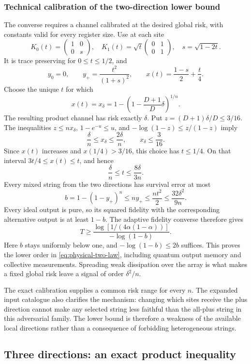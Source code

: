 \documentclass[11pt,a4paper]{article}
\numberwithin{equation}{section}
\begin{document}
\subsubsection*{Technical calibration of the two-direction lower bound}

The converse requires a channel calibrated at the desired global risk, with constants valid for every register size. Use at each site
\[
 K_0(t)=\begin{pmatrix}1&0\\0&s\end{pmatrix},
 \quad K_1(t)=\sqrt t\begin{pmatrix}0&1\\0&1\end{pmatrix},
 \quad s=\sqrt{1-2t}.
\]
It is trace preserving for $0\le t\le1/2$, and
\[
 y_0=0,\qquad y_+=\frac{t^2}{(1+s)^2},
 \qquad x(t)=\frac{1-s}{2}+\frac t4.
\]
Choose the unique $t$ for which
\[
 x(t)=x_\delta
 =1-\left(1-\frac{D+1}{D}\delta\right)^{1/n}.
\]
The resulting product channel has risk exactly $\delta$. Put $z=(D+1)\delta/D\le3/16$. The inequalities
$z\le nx_\delta$, $1-e^{-u}\le u$, and $-\log(1-z)\le z/(1-z)$ imply
\[
 \frac\delta n\le x_\delta\le\frac{2\delta}{n},
 \qquad x_\delta\le\frac3{16}.
\]
Since $x(t)$ increases and $x(1/4)>3/16$, this choice has $t\le1/4$. On that interval $3t/4\le x(t)\le t$, and hence
\[
 \frac\delta n\le t\le\frac{8\delta}{3n}.
\]
Every mixed string from the two directions has survival error at most
\[
 b=1-(1-y_+)^n\le ny_+\le\frac{nt^2}{2}
 \le\frac{32\delta^2}{9n}.
\]
Every ideal output is pure, so its squared fidelity with the corresponding alternative output is at least $1-b$. The adaptive fidelity converse therefore gives
\[
 T\ge\frac{\log[1/(4\alpha(1-\alpha))]}{-\log(1-b)}.
\]
Here $b$ stays uniformly below one, and $-\log(1-b)\le2b$ suffices. This proves the lower order in \eqref{eq:physical-two-law}, including quantum output memory and collective measurements. Spreading weak dissipation over the array is what makes a fixed global risk leave a signal of order $\delta^2/n$.

The exact calibration supplies a common risk range for every $n$. The expanded input catalogue also clarifies the mechanism: changing which sites receive the plus direction cannot make any selected string less faithful than the all-plus string in this adversarial family. The lower bound is therefore a weakness of the available local directions rather than a consequence of forbidding heterogeneous strings.

\subsection{Three directions: an exact product inequality}
\end{document}
